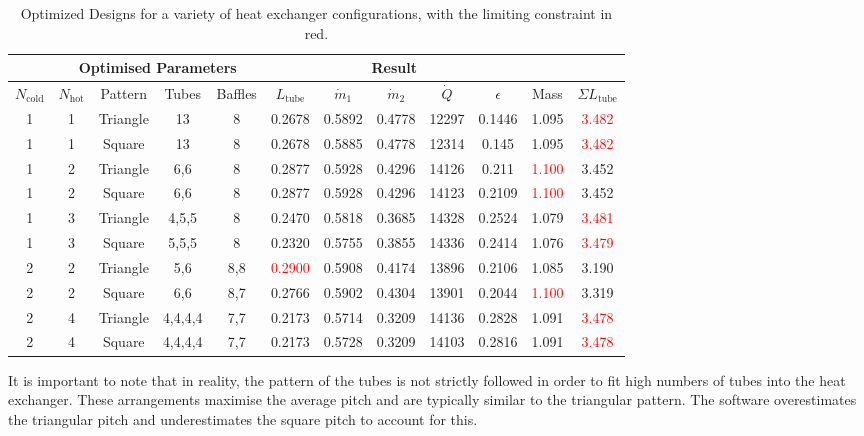 \documentclass{article}
\begin{document}
\begin{table}[h!]
  \centering
  \begin{tabular}{|c|c|c|c|c|c|c|c|c|c|c|c|}
      \hline
      \rowcolor{gray!30}
      \multicolumn{3}{|c|}{\textbf{Configuration}} & \multicolumn{4}{c|}{\textbf{Optimised Parameters}} & \multicolumn{5}{c|}{\textbf{Result}} \\ \hline
      \rowcolor{gray!10}
      $N_\text{cold}$ & $N_\text{hot}$ & Pattern & Tubes & Baffles & $L_\text{tube}$ & $\dot{m}_1$ & $\dot{m}_2$ & $\dot{Q}$ & $\epsilon$ & Mass & $\Sigma L_\text{tube}$ \\ \hline
      1 & 1 & Triangle & 13 & 8 & 0.2678 & 0.5892 & 0.4778 & 12297 & 0.1446 & 1.095 & \textcolor{red}{3.482} \\ \hline
      1 & 1 & Square & 13 & 8 & 0.2678 & 0.5885 & 0.4778 & 12314 & 0.145 & 1.095 & \textcolor{red}{3.482} \\ \hline
      1 & 2 & Triangle & 6,6 & 8 & 0.2877 & 0.5928 & 0.4296 & 14126 & 0.211 & \textcolor{red}{1.100} & 3.452 \\ \hline
      1 & 2 & Square & 6,6 & 8 & 0.2877 & 0.5928 & 0.4296 & 14123 & 0.2109 & \textcolor{red}{1.100} & 3.452 \\ \hline
      \rowcolor{yellow!60}
      1 & 3 & Triangle & 4,5,5 & 8 & 0.2470 & 0.5818 & 0.3685 & 14328 & 0.2524 & 1.079 & \textcolor{red}{3.481} \\ \hline
      1 & 3 & Square & 5,5,5 & 8 & 0.2320 & 0.5755 & 0.3855 & 14336 & 0.2414 & 1.076 & \textcolor{red}{3.479} \\ \hline
      2 & 2 & Triangle & 5,6 & 8,8 & \textcolor{red}{0.2900} & 0.5908 & 0.4174 & 13896 & 0.2106 & 1.085 & 3.190 \\ \hline
      2 & 2 & Square & 6,6 & 8,7 & 0.2766 & 0.5902 & 0.4304 & 13901 & 0.2044 & \textcolor{red}{1.100} & 3.319 \\ \hline
      2 & 4 & Triangle & 4,4,4,4 & 7,7 & 0.2173 & 0.5714 & 0.3209 & 14136 & 0.2828 & 1.091 & \textcolor{red}{3.478} \\ \hline
      2 & 4 & Square & 4,4,4,4 & 7,7 & 0.2173 & 0.5728 & 0.3209 & 14103 & 0.2816 & 1.091 & \textcolor{red}{3.478} \\ \hline
  \end{tabular}
  \caption{Optimized Designs for a variety of heat exchanger configurations, with the limiting constraint in red.}
  \label{table:designs}
\end{table}

It is important to note that in reality, the pattern of the tubes is not strictly followed in order to fit high numbers of tubes into the heat exchanger.
These arrangements maximise the average pitch and are typically similar to the triangular pattern.
The software overestimates the triangular pitch and underestimates the square pitch to account for this.
\end{document}
